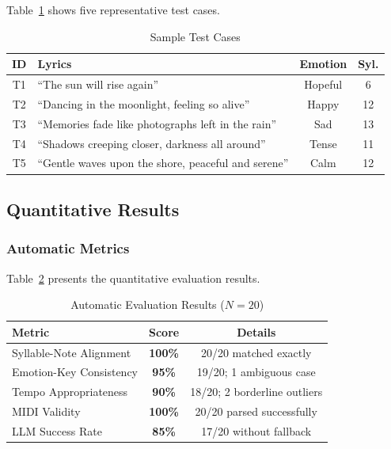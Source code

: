 \documentclass[conference]{IEEEtran}
\begin{document}
Table~\ref{tab:test_cases} shows five representative test cases.

\begin{table}[htbp]
\caption{Sample Test Cases}
\label{tab:test_cases}
\centering
\begin{tabular}{@{}clcc@{}}
\toprule
\textbf{ID} & \textbf{Lyrics} & \textbf{Emotion} & \textbf{Syl.} \\
\midrule
T1 & ``The sun will rise again'' & Hopeful & 6 \\
T2 & ``Dancing in the moonlight, feeling so alive'' & Happy & 12 \\
T3 & ``Memories fade like photographs left in the rain'' & Sad & 13 \\
T4 & ``Shadows creeping closer, darkness all around'' & Tense & 11 \\
T5 & ``Gentle waves upon the shore, peaceful and serene'' & Calm & 12 \\
\bottomrule
\end{tabular}
\end{table}

\subsection{Quantitative Results}

\subsubsection{Automatic Metrics}

Table~\ref{tab:results} presents the quantitative evaluation results.

\begin{table}[htbp]
\caption{Automatic Evaluation Results ($N=20$)}
\label{tab:results}
\centering
\begin{tabular}{@{}lcc@{}}
\toprule
\textbf{Metric} & \textbf{Score} & \textbf{Details} \\
\midrule
Syllable-Note Alignment   & \textbf{100\%} & 20/20 matched exactly \\
Emotion-Key Consistency   & \textbf{95\%}  & 19/20; 1 ambiguous case \\
Tempo Appropriateness     & \textbf{90\%}  & 18/20; 2 borderline outliers \\
MIDI Validity             & \textbf{100\%} & 20/20 parsed successfully \\
LLM Success Rate          & \textbf{85\%}  & 17/20 without fallback \\
\bottomrule
\end{tabular}
\end{table}
\end{document}
